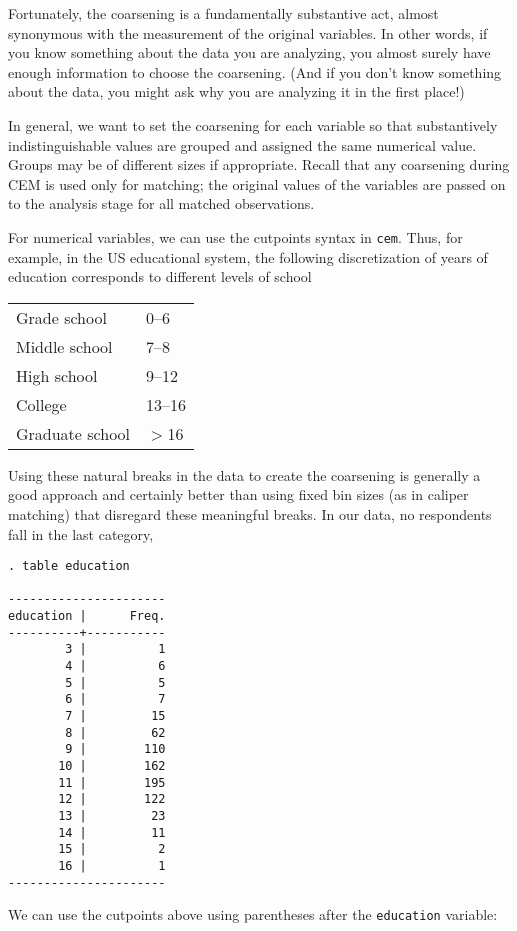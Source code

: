 \documentclass[11pt]{article}
\begin{document}
Fortunately, the coarsening is a fundamentally substantive act, almost
synonymous with the measurement of the original variables.  In other
words, if you know something about the data you are analyzing, you
almost surely have enough information to choose the coarsening.  (And
if you don't know something about the data, you might ask why you are
analyzing it in the first place!) 

In general, we want to set the coarsening for each variable so that
substantively indistinguishable values are grouped and assigned the
same numerical value.  Groups may be of different sizes if
appropriate.  Recall that any coarsening during CEM is used only for
matching; the original values of the variables are passed on to the
analysis stage for all matched observations.

For numerical variables, we can use the cutpoints syntax in \texttt{cem}.
Thus, for example, in the US educational system, the following
discretization of years of education corresponds to different levels of
school
\begin{center}
\begin{tabular}{ll}
Grade school    & 0--6\\
Middle school   & 7--8\\
High school     & 9--12\\
College         & 13--16\\
Graduate school & $>$16 
\end{tabular}
\end{center}
Using these natural breaks in the data to create the coarsening is
generally a good approach and certainly better than using fixed bin sizes
(as in caliper matching) that disregard these meaningful breaks.  In our
data, no respondents fall in the last category,

\begin{verbatim}
. table education

----------------------
education |      Freq.
----------+-----------
        3 |          1
        4 |          6
        5 |          5
        6 |          7
        7 |         15
        8 |         62
        9 |        110
       10 |        162
       11 |        195
       12 |        122
       13 |         23
       14 |         11
       15 |          2
       16 |          1
----------------------

\end{verbatim}

We can use the cutpoints above using parentheses after the
\texttt{education} variable:
\end{document}
